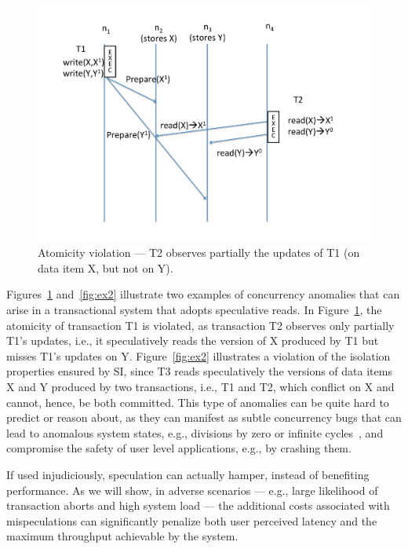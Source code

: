 \begin{figure}[t!]
\centering
\hspace{-5mm}
\includegraphics[scale = 0.24]{figures/example1.pdf}
\vspace{-5mm}
\caption{\footnotesize Atomicity violation --- T2 observes partially the updates of T1 (on data item X, but not on Y).}
\label{fig:ex1}
\vspace{-5mm}
\end{figure}


Figures~\ref{fig:ex1} and~\ref{fig:ex2} illustrate two examples of concurrency anomalies that can arise in a transactional system that adopts speculative reads. In Figure~\ref{fig:ex1}, the atomicity of transaction T1 is violated, as transaction T2 observes only partially T1's updates, i.e., it speculatively reads the version of X produced by T1 but misses T1's updates on Y. Figure~\ref{fig:ex2} illustrates a violation of the isolation properties ensured by SI, since T3 reads speculatively the versions of data items X and Y  produced by two transactions, i.e., T1 and T2, which conflict on X and cannot, hence, be both committed. This type of anomalies can be quite hard to predict or reason about, as they can manifest as subtle concurrency bugs that can lead to anomalous system states, e.g., divisions by zero or infinite cycles~\cite{guerraoui2007opacity}, and compromise the safety of user level applications, e.g., by crashing them.

\vspace{4pt} If used injudiciously, speculation can actually hamper, instead of benefiting performance. As we will show, in adverse scenarios  --- e.g., large likelihood of transaction aborts and high system load --- the additional costs associated with mispeculations can significantly penalize both user perceived latency and the maximum throughput achievable by the system.

